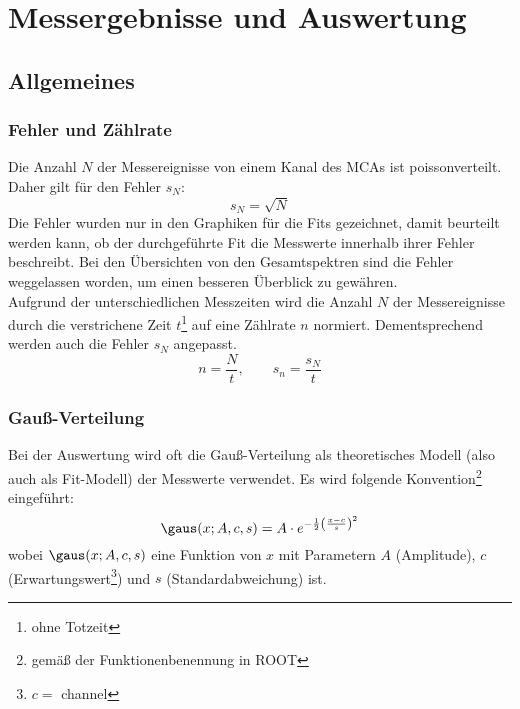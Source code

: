 \section{Messergebnisse und Auswertung}
\subsection{Allgemeines}
\subsubsection{Fehler und Zählrate}
\label{subsub:errorsandcounts}
Die Anzahl $N$ der Messereignisse von einem Kanal des MCAs ist poissonverteilt. Daher gilt für den Fehler $s_N$:
\begin{equation}
\label{eq:poisson:error}
  s_N = \sqrt{N}
\end{equation} 
Die Fehler wurden nur in den Graphiken für die Fits gezeichnet, damit beurteilt werden kann, ob der durchgeführte Fit die Messwerte innerhalb
ihrer Fehler beschreibt. Bei den Übersichten von den Gesamtspektren sind die Fehler weggelassen worden, um einen besseren Überblick zu gewähren. \\[\baselineskip]
Aufgrund der unterschiedlichen Messzeiten wird die Anzahl $N$ der Messereignisse durch die verstrichene Zeit $t$\footnote{ohne Totzeit}
auf eine Zählrate $n$ normiert. Dementsprechend werden auch die Fehler $s_N$ angepasst.
\begin{equation}
\label{eq:countrate}
  n = \frac{N}{t}, \qquad s_n = \frac{s_N}{t}
\end{equation}

\subsubsection{Gauß-Verteilung}
\label{subsub:gaus}
Bei der Auswertung wird oft die Gauß-Verteilung als theoretisches Modell (also auch als Fit-Modell) der Messwerte verwendet. Es wird folgende 
Konvention\footnote{gemäß der Funktionenbenennung in ROOT} eingeführt:
\begin{equation}
  \label{eq:gaus}
  \gaus(x; A, c, s) = A \cdot e^{-\frac{1}{2} \left( \frac{x - c}{s} \right)^2}
\end{equation}
wobei $\gaus(x; A, c, s)$ eine Funktion von $x$ mit Parametern $A$ (Amplitude), $c$ (Erwartungswert\footnote{$c=$ channel}) und 
$s$ (Standardabweichung) ist.

